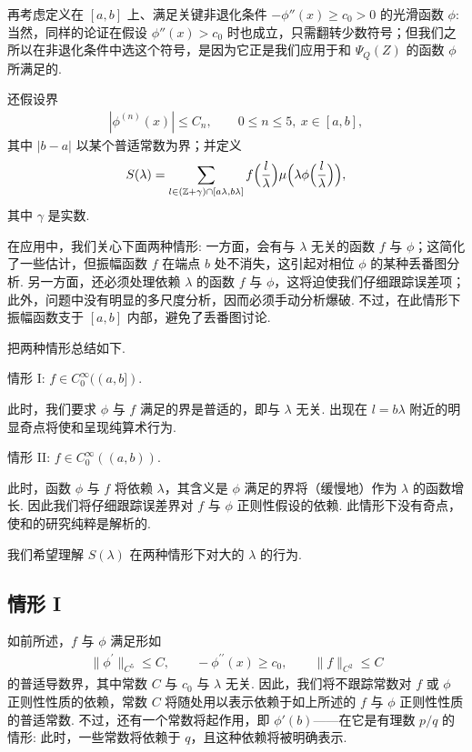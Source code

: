 再考虑定义在 $[a,b]$ 上、满足关键非退化条件 $-\phi''(x) \geq c_0 > 0$ 的光滑函数 $\phi$: 当然，同样的论证在假设 $\phi''(x) > c_0$ 时也成立，只需翻转少数符号；但我们之所以在非退化条件中选这个符号，是因为它正是我们应用于和 $\Psi_Q(Z)$ 的函数 $\phi$ 所满足的.

还假设界
\begin{align*}
  |\phi^{(n)}(x)|\leq C_{n},\qquad 0\leq n\leq 5,\ x\in[a,b],
\end{align*}
其中 $|b - a|$ 以某个普适常数为界；并定义
\begin{align*}
  S(\lambda)=\sum_{l\in(\mathbb{Z}+\gamma)\cap[a\lambda,b\lambda]}f\Big(\frac{l}{\lambda}\Big)\mu\Big(\lambda\phi\Big(\frac{l}{\lambda}\Big)\Big),
\end{align*}
其中 $\gamma$ 是实数.

在应用中，我们关心下面两种情形: 一方面，会有与 $\lambda$ 无关的函数 $f$ 与 $\phi$；这简化了一些估计，但振幅函数 $f$ 在端点 $b$ 处不消失，这引起对相位 $\phi$ 的某种丢番图分析. 另一方面，还必须处理依赖 $\lambda$ 的函数 $f$ 与 $\phi$，这将迫使我们仔细跟踪误差项；此外，问题中没有明显的多尺度分析，因而必须手动分析爆破. 不过，在此情形下振幅函数支于 $[a, b]$ 内部，避免了丢番图讨论.

把两种情形总结如下.

情形 I: $f \in C_0^\infty((a, b])$.

此时，我们要求 $\phi$ 与 $f$ 满足的界是普适的，即与 $\lambda$ 无关. 出现在 $l = b\lambda$ 附近的明显奇点将使和呈现纯算术行为.

情形 II: $f \in C_0^\infty((a,b))$.

此时，函数 $\phi$ 与 $f$ 将依赖 $\lambda$，其含义是 $\phi$ 满足的界将（缓慢地）作为 $\lambda$ 的函数增长. 因此我们将仔细跟踪误差界对 $f$ 与 $\phi$ 正则性假设的依赖. 此情形下没有奇点，使和的研究纯粹是解析的.

我们希望理解 $S(\lambda)$ 在两种情形下对大的 $\lambda$ 的行为.

\subsection{情形 I}

如前所述，$f$ 与 $\phi$ 满足形如
\begin{align*}
  \|\phi^{\prime}\|_{C^{5}}\leq C,\qquad -\phi^{\prime\prime}(x)\geq c_{0},\qquad \|f\|_{C^{2}}\leq C
\end{align*}
的普适导数界，其中常数 $C$ 与 $c_0$ 与 $\lambda$ 无关. 因此，我们将不跟踪常数对 $f$ 或 $\phi$ 正则性性质的依赖，常数 $C$ 将随处用以表示依赖于如上所述的 $f$ 与 $\phi$ 正则性性质的普适常数. 不过，还有一个常数将起作用，即 $\phi'(b)$——在它是有理数 $p/q$ 的情形: 此时，一些常数将依赖于 $q$，且这种依赖将被明确表示.

